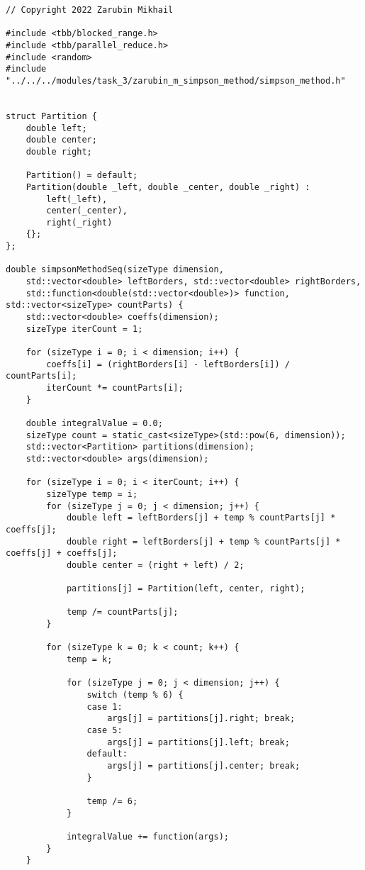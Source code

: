\documentclass{report}
\begin{document}
\begin{lstlisting}
// Copyright 2022 Zarubin Mikhail

#include <tbb/blocked_range.h>
#include <tbb/parallel_reduce.h>
#include <random>
#include "../../../modules/task_3/zarubin_m_simpson_method/simpson_method.h"


struct Partition {
    double left;
    double center;
    double right;

    Partition() = default;
    Partition(double _left, double _center, double _right) :
        left(_left),
        center(_center),
        right(_right)
    {};
};

double simpsonMethodSeq(sizeType dimension,
    std::vector<double> leftBorders, std::vector<double> rightBorders,
    std::function<double(std::vector<double>)> function, std::vector<sizeType> countParts) {
    std::vector<double> coeffs(dimension);
    sizeType iterCount = 1;

    for (sizeType i = 0; i < dimension; i++) {
        coeffs[i] = (rightBorders[i] - leftBorders[i]) / countParts[i];
        iterCount *= countParts[i];
    }

    double integralValue = 0.0;
    sizeType count = static_cast<sizeType>(std::pow(6, dimension));
    std::vector<Partition> partitions(dimension);
    std::vector<double> args(dimension);

    for (sizeType i = 0; i < iterCount; i++) {
        sizeType temp = i;
        for (sizeType j = 0; j < dimension; j++) {
            double left = leftBorders[j] + temp % countParts[j] * coeffs[j];
            double right = leftBorders[j] + temp % countParts[j] * coeffs[j] + coeffs[j];
            double center = (right + left) / 2;

            partitions[j] = Partition(left, center, right);

            temp /= countParts[j];
        }

        for (sizeType k = 0; k < count; k++) {
            temp = k;

            for (sizeType j = 0; j < dimension; j++) {
                switch (temp % 6) {
                case 1:
                    args[j] = partitions[j].right; break;
                case 5:
                    args[j] = partitions[j].left; break;
                default:
                    args[j] = partitions[j].center; break;
                }

                temp /= 6;
            }

            integralValue += function(args);
        }
    }


\end{lstlisting}
\end{document}
